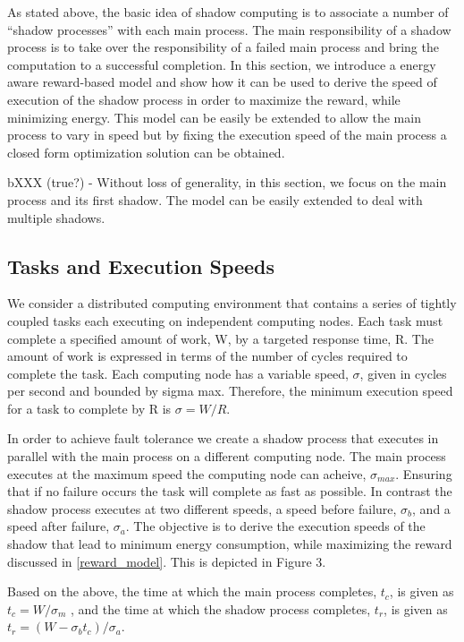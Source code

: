 As stated above, the basic idea of shadow computing is to associate a
number of “shadow processes” with each main process. The main
responsibility of a shadow process is to take over the responsibility
of a failed main process and bring the computation to a successful
completion.  In this section, we introduce a energy aware reward-based
model and show how it can be used to derive the speed of execution of
the shadow process in order to maximize the reward, while minimizing
energy. This model can be easily be extended to allow the main process
to vary in speed but by fixing the execution speed of the main process
a closed form optimization solution can be obtained.

bXXX (true?) - Without loss of generality, in this section, we focus on the
main process and its first shadow. The model can be easily extended to
deal with multiple shadows.

\subsection{Tasks and Execution Speeds}

We consider a distributed computing environment that contains a series
of tightly coupled tasks each executing on independent computing
nodes. Each task must complete a specified amount of work, W, by a
targeted response time, R. The amount of work is expressed in terms of
the number of cycles required to complete the task. Each computing
node has a variable speed, $\sigma$, given in cycles per second and
bounded by sigma max. Therefore, the minimum execution speed for a
task to complete by R is $\sigma=W/R$.

In order to achieve fault tolerance we create a shadow process that
executes in parallel with the main process on a different computing
node. The main process executes at the maximum speed the computing
node can acheive, $\sigma_{max}$. Ensuring that if no failure occurs the
task will complete as fast as possible. In contrast the shadow process
executes at two different speeds, a speed before failure, $\sigma_b$,
and a speed after failure, $\sigma_a$. The objective is to derive the
execution speeds of the shadow that lead to minimum energy
consumption, while maximizing the reward discussed in
\ref{reward_model}. This is depicted in Figure 3.

Based on the above, the time at which the main process completes, $t_c$,
is given as $t_c=W/\sigma_m$ , and the time at which the shadow process
completes, $t_r$, is given as $t_r =(W-\sigma_b t_c)/\sigma_a$.


